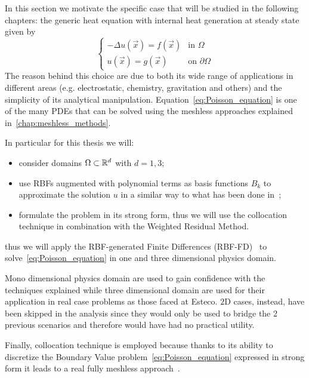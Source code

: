 In this section we motivate the specific case that will be studied in the following chapters: the generic heat equation with internal heat generation at steady state given by
\begin{equation}
	\label{eq:Poisson_equation}
	\begin{cases}
		- \Delta u(\vec{x}) = f(\vec{x})														 &  \text{in $\Omega$}							\\
		u(\vec{x}) = g(\vec{x})  																		&  \text{on $\partial\Omega$}
	\end{cases}
\end{equation}
The reason behind this choice are due to both its wide range of applications in different areas	(e.g. electrostatic, chemistry, gravitation and others) and the simplicity of its analytical manipulation. Equation~\eqref{eq:Poisson_equation} is one of the many PDEs that can be solved using the meshless approaches explained in~\ref{chap:meshless_methods}.

In particular for this thesis we will:
\begin{itemize}
	\item consider domains $\Omega \subset \mathbb{R}^{d}$ with $d=1,3$;
	\item use RBFs augmented with polynomial terms as basis functions $B_k$ to approximate the solution $u$ in a similar way to what has been done in~\cite{Liu:Intro_to_meshfree_methods}; 
	\item formulate the problem in its strong form, thus we will use the collocation technique in combination with the Weighted Residual Method.
\end{itemize}
thus we will apply the RBF-generated Finite Differences (RBF-FD)~\cite{Fornberg:RBF-FD_1, Fornberg:RBF-FD_2} to solve~\eqref{eq:Poisson_equation} in one and three dimensional physics domain.

Mono dimensional physics domain are used to gain confidence with the techniques explained while three dimensional  domain are used for their application in real case problems as those faced at Esteco. $2$D cases, instead, have been skipped in the analysis since they would only be used to bridge the 2 previous scenarios and therefore would have had no practical utility.


Finally, collocation technique is employed because thanks to its ability to discretize the Boundary Value problem~\eqref{eq:Poisson_equation} expressed in strong form it leads to a real fully meshless approach~\cite{Miotti:RBF_in_depth}.


